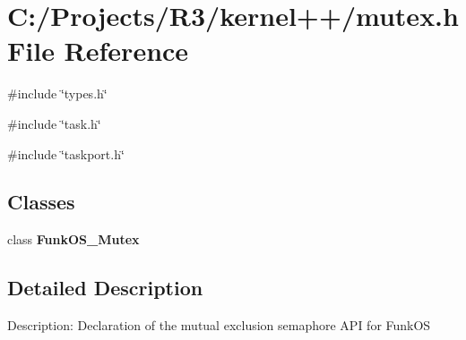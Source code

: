 \section{C:/Projects/R3/kernel++/mutex.h File Reference}
\label{mutex_8h}
{\ttfamily \#include \char`\"{}types.h\char`\"{}}\par
{\ttfamily \#include \char`\"{}task.h\char`\"{}}\par
{\ttfamily \#include \char`\"{}taskport.h\char`\"{}}\par
\subsection*{Classes}
\begin{DoxyCompactItemize}
\item 
class {\bf FunkOS\_\-Mutex}
\end{DoxyCompactItemize}


\subsection{Detailed Description}
Description: Declaration of the mutual exclusion semaphore API for FunkOS 